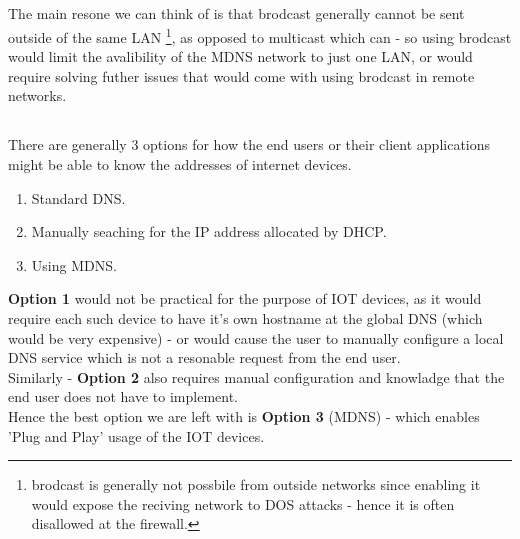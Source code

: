 \subsection{}

The main resone we can think of is that brodcast generally
cannot be sent outside of the same LAN
\footnote{brodcast is generally not possbile from outside networks
since enabling it would expose the reciving network to DOS attacks - hence it is
often disallowed at the firewall.}, as opposed to multicast
which can - so using brodcast would limit the avalibility of the MDNS network
to just one LAN, or would require solving futher issues that would come with using
brodcast in remote networks.


\subsection{}
There are generally 3 options for how the end users or their client
applications might be able to know the addresses of internet devices.
\begin{enumerate}
    \item Standard DNS.
    \item Manually seaching for the IP address allocated by DHCP.
    \item Using MDNS.
\end{enumerate}
\textbf{Option 1} would not be practical for the purpose of IOT devices,
as it would require each such device to have it's own hostname at the global
DNS (which would be very expensive) - or would cause the user to manually configure
a local DNS service which is not a resonable request from the end user.\\

Similarly - \textbf{Option 2} also requires manual configuration and knowladge that the
end user does not have to implement.\\

Hence the best option we are left with is \textbf{Option 3} (MDNS) - which enables 'Plug and Play'
usage of the IOT devices.
